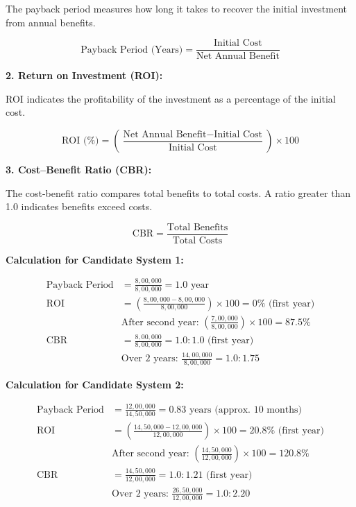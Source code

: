 \documentclass[12pt,a4paper]{article}
\begin{document}
The payback period measures how long it takes to recover the initial investment from annual benefits.

$$\text{Payback Period (Years)} = \frac{\text{Initial Cost}}{\text{Net Annual Benefit}}$$

\vspace{0.3cm}
\noindent\textbf{2. Return on Investment (ROI):}

ROI indicates the profitability of the investment as a percentage of the initial cost.

$$\text{ROI (\%)} = \left(\frac{\text{Net Annual Benefit} - \text{Initial Cost}}{\text{Initial Cost}}\right) \times 100$$

\vspace{0.3cm}
\noindent\textbf{3. Cost–Benefit Ratio (CBR):}

The cost-benefit ratio compares total benefits to total costs. A ratio greater than 1.0 indicates benefits exceed costs.

$$\text{CBR} = \frac{\text{Total Benefits}}{\text{Total Costs}}$$

\vspace{2cm}
\noindent\textbf{Calculation for Candidate System 1:}

\begin{align*}
\text{Payback Period} &= \frac{8,00,000}{8,00,000} = 1.0 \text{ year} \\[0.3cm]
\text{ROI} &= \left(\frac{8,00,000 - 8,00,000}{8,00,000}\right) \times 100 = 0\% \text{ (first year)}\\
&\text{After second year: } \left(\frac{7,00,000}{8,00,000}\right) \times 100 = 87.5\% \\[0.3cm]
\text{CBR} &= \frac{8,00,000}{8,00,000} = 1.0 : 1.0 \text{ (first year)}\\
&\text{Over 2 years: } \frac{14,00,000}{8,00,000} = 1.0 : 1.75
\end{align*}

\newpage

\noindent\textbf{Calculation for Candidate System 2:}

\begin{align*}
\text{Payback Period} &= \frac{12,00,000}{14,50,000} = 0.83 \text{ years (approx. 10 months)} \\[0.3cm]
\text{ROI} &= \left(\frac{14,50,000 - 12,00,000}{12,00,000}\right) \times 100 = 20.8\% \text{ (first year)}\\
&\text{After second year: } \left(\frac{14,50,000}{12,00,000}\right) \times 100 = 120.8\% \\[0.3cm]
\text{CBR} &= \frac{14,50,000}{12,00,000} = 1.0 : 1.21 \text{ (first year)}\\
&\text{Over 2 years: } \frac{26,50,000}{12,00,000} = 1.0 : 2.20
\end{align*}
\end{document}
